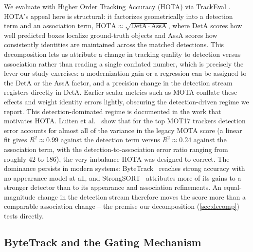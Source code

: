 We evaluate with Higher Order Tracking Accuracy (HOTA) \cite{luiten2021hota} via TrackEval \cite{luiten2020trackeval}. HOTA's appeal here is structural: it factorizes geometrically into a detection term and an association term, $\mathrm{HOTA} \approx \sqrt{\mathrm{DetA} \cdot \mathrm{AssA}}$, where DetA scores how well predicted boxes localize ground-truth objects and AssA scores how consistently identities are maintained across the matched detections. This decomposition lets us attribute a change in tracking quality to detection versus association rather than reading a single conflated number, which is precisely the lever our study exercises: a modernization gain or a regression can be assigned to the DetA or the AssA factor, and a precision change in the detection stream registers directly in DetA. Earlier scalar metrics such as MOTA conflate these effects and weight identity errors lightly, obscuring the detection-driven regime we report. This detection-dominated regime is documented in the work that motivates HOTA. Luiten et al.~\cite{luiten2021hota} show that for the top MOT17 trackers detection error accounts for almost all of the variance in the legacy MOTA score (a linear fit gives $R^2 \approx 0.99$ against the detection term versus $R^2 \approx 0.24$ against the association term, with the detection-to-association error ratio ranging from roughly $42$ to $186$), the very imbalance HOTA was designed to correct. The dominance persists in modern systems: ByteTrack~\cite{zhang2022bytetrack} reaches strong accuracy with no appearance model at all, and StrongSORT~\cite{du2023strongsort} attributes more of its gains to a stronger detector than to its appearance and association refinements. An equal-magnitude change in the detection stream therefore moves the score more than a comparable association change -- the premise our decomposition (\cref{sec:decomp}) tests directly.

\subsection{ByteTrack and the Gating Mechanism}

